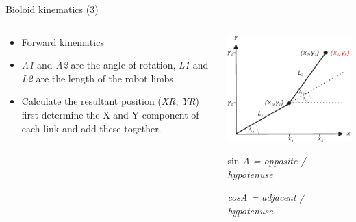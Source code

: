 \documentclass[compress]{beamer}
\begin{document}
\begin{frame}{Bioloid kinematics (3)}

    \begin{columns}
        \begin{column}{0.5\linewidth}
    \begin{itemize}

        \item Forward kinematics
        \item \emph{A1} and \emph{A2} are the angle of rotation, \emph{L1} and
            \emph{L2} are the length of the robot limbs
        \item Calculate the resultant position (\emph{XR}, \emph{YR}) first
            determine the X and Y component of each link and add these together.
    \end{itemize}
            
        \end{column}
        \begin{column}{0.5\linewidth}

            \begin{center}
                \includegraphics[width=0.8\linewidth]{image32}
            \end{center}

    sin \emph{A = opposite / hypotenuse}

    \emph{cosA = adjacent / hypotenuse}
        \end{column}
    \end{columns}


\end{frame}
\end{document}
